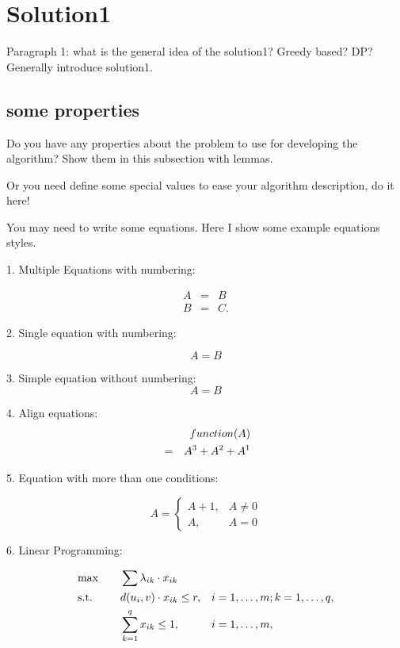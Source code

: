 \section{Solution1}
\label{sec:solution1}

Paragraph 1: what is the general idea of the solution1? Greedy based? DP? Generally introduce solution1.

\subsection{some properties}
Do you have any properties about the problem to use for developing the algorithm? Show them in this subsection with lemmas. 

Or you need define some special values to ease your algorithm description, do it here!


You may need to write some equations. Here I show some example equations styles.

1. Multiple Equations with numbering:

\begin{eqnarray}
A &=& B \label{eq:equation1}\\
B &=& C.\label{eq:equation2}
\end{eqnarray}

2. Single equation with numbering:

\begin{equation}
A = B \label{eq:equation3}
\end{equation}

3. Simple equation without numbering:
$$A = B$$

4. Align equations:
\begin{eqnarray}
&& function(A) \notag\\
&=& A^3 +  A^2 + A^1\label{eq:equation4}
\end{eqnarray}

5. Equation with more than one conditions:

\begin{equation}
A=\left\{
\begin{array}{ll}
A + 1, & A \neq 0 \\
A, & A = 0
\end{array}
\right. \label{eq:equation5}
\end{equation}

6. Linear Programming:

\begin{alignat}{2}
& \text{max}&  & \sum\lambda_{ik}\cdot x_{ik}\\
& \text{s.t.}&    \quad & 
\begin{aligned}[t]
&d(u_i, v)\cdot x_{ik} \leq r,    &&i =1, \dots, m; k = 1, \dots, q,\\
&\sum_{k=1}^{q} x_{ik} \leq 1,					 &&i =1, \dots, m,
\end{aligned}\notag
\end{alignat}

